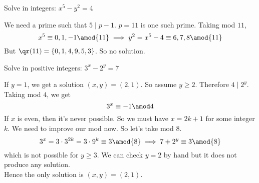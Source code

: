 \documentclass[11pt]{scrartcl}
\begin{document}
\begin{exercise}
Solve in integers: \(x^5 - y^2 = 4\)
\end{exercise}
\begin{soln}
We need a prime such that \(5 \mid p-1\). \(p=11\) is one such prime. Taking mod \(11\),
\[x^5 \equiv 0,1,-1 \amod{11} \implies y^2 = x^5 - 4 \equiv 6,7,8 \amod{11}\]
But \(\qr(11) = \left\{ 0,1,4,9,5,3 \right\} \). So no solution.
\end{soln}
\begin{exercise}
Solve in positive integers: \(3^x - 2^y = 7\)
\end{exercise}
\begin{soln}
If \(y=1\), we get a solution \((x,y) = (2,1)\). So assume \(y\geq 2\). Therefore \(4 \mid 2^y\). Taking mod \(4\), we get
\[3^x \equiv -1 \amod 4\]
If \(x\) is even, then it's never possible. So we must have \(x=2k+1\) for some integer \(k\). We need to improve our mod now. So let's take mod \(8\). 
\[3^{x} = 3\cdot 3^{2k} = 3 \cdot 9^k \equiv 3 \amod{8} \implies 7+ 2^y \equiv 3 \amod{8}\]
which is not possible for \(y\geq 3\). We can check \(y=2\) by hand but it does not produce any solution. \\
Hence the only solution is \((x,y) = (2,1)\).
\end{soln}
\end{document}
